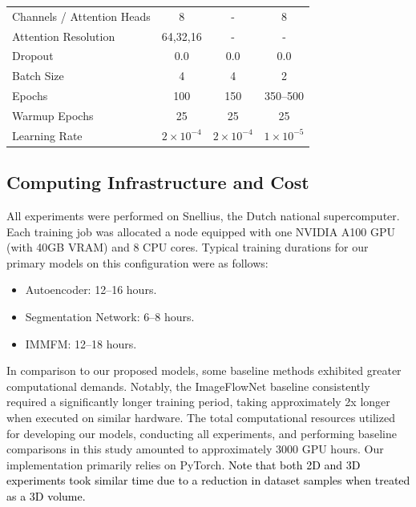 \documentclass[twoside]{article}
\newcommand{\bc}[1]{\textcolor{black}{#1}}
\begin{document}
\begin{table}[th]
\begin{tabular}{lccc}
Channels / Attention Heads      & 8                           & -                             & 8                           \\
Attention Resolution            & 64,32,16                    & -                             & -                \\
Dropout                         & 0.0                         & 0.0                           & 0.0                         \\
Batch Size                      & 4                           & 4                             & 2                           \\
Epochs                          & 100                         & 150                           & 350--500                    \\
Warmup Epochs                   & 25                          & 25                            & 25                          \\
Learning Rate                   & $2 \times 10^{-4}$          & $2 \times 10^{-4}$            & $1 \times 10^{-5}$          \\
\bottomrule
\end{tabular}
\end{table}


\subsection{Computing Infrastructure and Cost}

All experiments were performed on Snellius, the Dutch national supercomputer. Each training job was allocated a node equipped with one NVIDIA A100 GPU (with 40GB VRAM) and 8 CPU cores. 
Typical training durations for our primary models on this configuration were as follows:
\begin{itemize}
    \item Autoencoder: 12--16 hours.
    \item Segmentation Network: 6--8 hours.
    \item IMMFM: 12--18 hours.
\end{itemize}

In comparison to our proposed models, some baseline methods exhibited greater computational demands. Notably, the ImageFlowNet baseline consistently required a significantly longer training period, taking approximately 2x longer when executed on similar hardware. The total computational resources utilized for developing our models, conducting all experiments, and performing baseline comparisons in this study amounted to approximately 3000 GPU hours. Our implementation primarily relies on PyTorch. \bc{ Note that both 2D and 3D experiments took similar time due to a reduction in dataset samples when treated as a 3D volume.}
\end{document}
